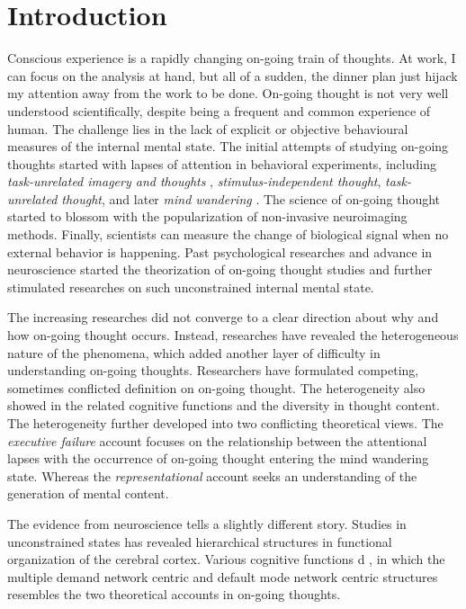 \chapter{Introduction}
\label{ch:intro}

Conscious experience is a rapidly changing on-going train of thoughts. At work, I can focus on the analysis at hand, but all of a sudden, the dinner plan just hijack my attention away from the work to be done. On-going thought is not very well understood scientifically, despite being a frequent and common experience of human. The challenge lies in the lack of explicit or objective behavioural measures of the internal mental state. The initial attempts of studying on-going thoughts started with lapses of attention in behavioral experiments, including \textit{task-unrelated imagery and thoughts} \cite{Giambra1995}, \textit{stimulus-independent thought}\cite{Antrobus1968}, \textit{task-unrelated thought}, and later \textit{mind wandering} \cite{SmallwoodSchooler2015}. The science of on-going thought started to blossom with the popularization of non-invasive neuroimaging methods. Finally, scientists can measure the change of biological signal when no external behavior is happening. Past psychological researches and advance in neuroscience started the theorization of on-going thought studies and further stimulated researches on such unconstrained internal mental state. 

The increasing researches did not converge to a clear direction about why and how on-going thought occurs. Instead, researches have revealed the heterogeneous nature of the phenomena, which added another layer of difficulty in understanding on-going thoughts. Researchers have formulated competing, sometimes conflicted definition on on-going thought. The heterogeneity also showed in the related cognitive functions and the diversity in thought content. The heterogeneity further developed into two conflicting theoretical views. The \textit{executive failure} account focuses on the relationship between the attentional lapses with the occurrence of on-going thought entering the mind wandering state. Whereas the \textit{representational} account seeks an understanding of the generation of mental content. 

The evidence from neuroscience tells a slightly different story. Studies in unconstrained states has revealed hierarchical structures in functional organization of the cerebral cortex. Various cognitive functions d 
, in which the multiple demand network centric and default mode network centric structures resembles the two theoretical accounts in on-going thoughts. 

